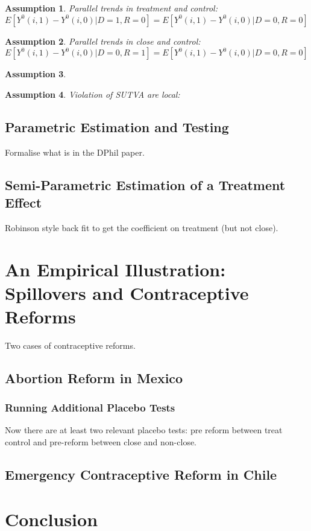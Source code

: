 \documentclass{article}
\newtheorem{assumption}{Assumption}
\begin{document}
\begin{spacing}{1.1}
\begin{assumption}
Parallel trends in treatment and control: \\
$E[Y^0(i,1)-Y^0(i,0)|D=1,R=0]=E[Y^0(i,1)-Y^0(i,0)|D=0,R=0]$
\end{assumption}

\begin{assumption}
Parallel trends in close and control: \\
$E[Y^0(i,1)-Y^0(i,0)|D=0,R=1]=E[Y^0(i,1)-Y^0(i,0)|D=0,R=0]$
\end{assumption}

\begin{assumption}

\end{assumption}

\begin{assumption}
Violation of SUTVA are local: \\ 
\end{assumption}


\subsection{Parametric Estimation and Testing}
Formalise what is in the DPhil paper.

\subsection{Semi-Parametric Estimation of a Treatment Effect}
Robinson style back fit to get the coefficient on treatment (but not close).

\section{An Empirical Illustration: Spillovers and Contraceptive Reforms}
Two cases of contraceptive reforms.
\subsection{Abortion Reform in Mexico}
\subsubsection{Running Additional Placebo Tests}
Now there are at least two relevant placebo tests: pre reform between treat control
and pre-reform between close and non-close.

\subsection{Emergency Contraceptive Reform in Chile}


\section{Conclusion}



\end{spacing}
\end{document}
